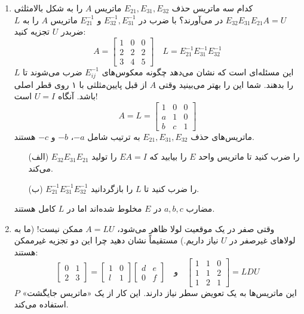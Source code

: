 \documentclass[12pt, a4paper]{book}
\begin{document}
\begin{enumerate}
		\item کدام سه ماتریس حذف $E_{21}, E_{31}, E_{32}$ ماتریس $A$ را به شکل بالامثلثی $E_{32}E_{31}E_{21}A=U$ در می‌آورند؟ با ضرب در $E_{32}^{-1}, E_{31}^{-1}$ و $E_{21}^{-1}$ ماتریس $A$ را به $L$ ضربدر $U$ تجزیه کنید:
		\[ A = \begin{bmatrix} 1 & 0 & 0 \\ 2 & 2 & 2 \\ 3 & 4 & 5 \end{bmatrix} \quad L = E_{21}^{-1}E_{31}^{-1}E_{32}^{-1} \]
		این مسئله‌ای است که نشان می‌دهد چگونه معکوس‌های $E_{ij}^{-1}$ ضرب می‌شوند تا $L$ را بدهند. شما این را بهتر می‌بینید وقتی $A$ از قبل پایین‌مثلثی با ۱ روی قطر اصلی باشد. آنگاه $U=I$ است!
		\[ A=L = \begin{bmatrix} 1 & 0 & 0 \\ a & 1 & 0 \\ b & c & 1 \end{bmatrix} \]
		ماتریس‌های حذف $E_{21}, E_{31}, E_{32}$ به ترتیب شامل $-a$، $-b$ و $-c$ هستند.
		\begin{itemize}
			\item[(الف)] $E_{32}E_{31}E_{21}$ را ضرب کنید تا ماتریس واحد $E$ را بیابید که $EA=I$ را تولید می‌کند.
			\item[(ب)] $E_{21}^{-1}E_{31}^{-1}E_{32}^{-1}$ را ضرب کنید تا $L$ را بازگردانید.
		\end{itemize}
		مضارب $a, b, c$ در $E$ مخلوط شده‌اند اما در $L$ کامل هستند.
		
		\item وقتی صفر در یک موقعیت لولا ظاهر می‌شود، $A=LU$ ممکن نیست! (ما به لولاهای غیرصفر در $U$ نیاز داریم.) مستقیماً نشان دهید چرا این دو تجزیه غیرممکن هستند:
		\[ \begin{bmatrix} 0 & 1 \\ 2 & 3 \end{bmatrix} = \begin{bmatrix} 1 & 0 \\ l & 1 \end{bmatrix} \begin{bmatrix} d & e \\ 0 & f \end{bmatrix} \quad \text{و} \quad \begin{bmatrix} 1 & 1 & 0 \\ 1 & 1 & 2 \\ 1 & 2 & 1 \end{bmatrix} = LDU \]
		این ماتریس‌ها به یک تعویض سطر نیاز دارند. این کار از یک «ماتریس جایگشت» $P$ استفاده می‌کند.
		

\end{enumerate}
\end{document}
